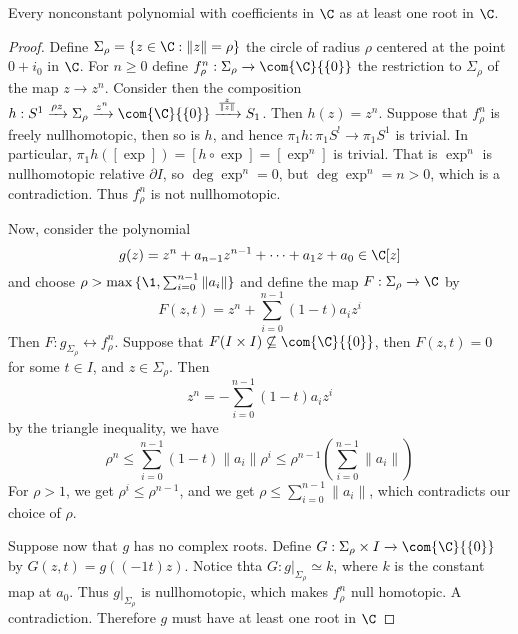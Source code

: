 \begin{theorem}\label{4.3.4}
    Every nonconstant polynomial with coefficients in $\C$ as at least one root
    in  $\C$.
\end{theorem}
\begin{proof}
    Define $\Sigma_\rho=\{z \in \C : \|z\|=\rho\}$ the circle of radius $\rho$
    centered at the point  $0+i_0$ in $\C$. For $n \geq 0$ define
    $f^n_\rho:\Sigma_\rho \xrightarrow{} \com{\C}{\{0\}}$ the restriction to
    $\Sigma_\rho$ of the map  $z \xrightarrow{} z^n$. Consider then the
    composition $h:S^1 \xrightarrow{\rho z} \Sigma_\rho \xrightarrow{z^n}
    \com{\C}{\{0\}} \xrightarrow{\frac{z}{\|z\|}} S_1$. Then $h(z)=z^n$. Suppose
    that $f^n_\rho$ is freely nullhomotopic, then so is  $h$, and hence
    $\pi_1{h}:\pi_1{S^!} \xrightarrow{} \pi_1{S^1}$ is trivial. In particular,
    $\pi_1{h}([\exp])=[h \circ \exp]=[\exp^n]$ is trivial. That is $\exp^n$ is
    nullhomotopic relative  $\partial{I}$, so $\deg{\exp^n}=0$, but
    $\deg{\exp^n}=n>0$, which is a contradiction. Thus $f^n_\rho$ is not
    nullhomotopic.

    Now, consider the polynomial
    \begin{equation*}
        g(z)=z^n+a_{n-1}z^{n-1}+\dots+a_1z+a_0 \in \C[z]
    \end{equation*}
    and choose $\rho>\max{\{\1, \sum_{i=0}^{n-1}{\|a_i\|}\}}$ and define the map
    $F:\Sigma_\rho \xrightarrow{} \C$ by
    \begin{equation*}
        F(z,t)=z^n+\sum_{i=0}^{n-1}{(1-t)a_iz^i}
    \end{equation*}
    Then $F:g_{\Sigma_\rho} \rel f^n_\rho$. Suppose that $F(I \times I)
    \not\subseteq \com{\C}{\{0\}}$, then $F(z,t)=0$ for some $t \in I$, and  $z \in
    \Sigma_\rho$. Then
    \begin{equation*}
        z^n=-\sum_{i=0}^{n-1}{(1-t)a_iz^i}
    \end{equation*}
    by the triangle inequality, we have
    \begin{equation*}
        \rho^n \leq \sum_{i=0}^{n-1}{(1-t)\|a_i\|\rho^i} \leq
        \rho^{n-1}(\sum_{i=0}^{n-1}{\|a_i\|})
    \end{equation*}
    For $\rho>1$, we get  $\rho^i \leq \rho^{n-1}$, and we get $\rho \leq
    \sum_{i=0}^{n-1}{\|a_i\|}$, which contradicts our choice of $\rho$.

    Suppose now that $g$ has no complex roots. Define $G:\Sigma_\rho \times I
    \xrightarrow{} \com{\C}{\{0\}}$ by $G(z,t)=g((-1t)z)$. Notice thta
    $G:g|_{\Sigma_\rho} \simeq k$, where $k$ is the constant map at $a_0$. Thus
    $g|_{\Sigma_\rho}$ is nullhomotopic, which makes $f^n_\rho$ null homotopic.
    A contradiction. Therefore $g$ must have at least one root in $\C$
\end{proof}
